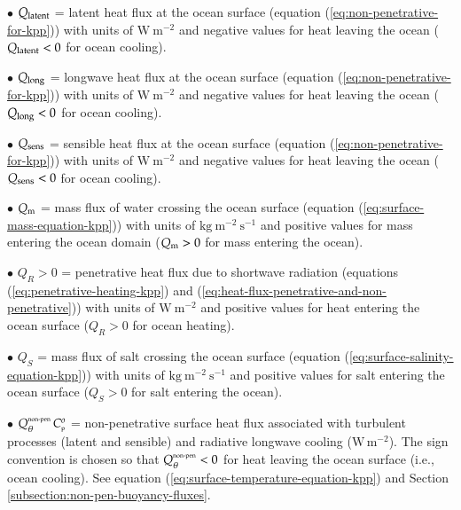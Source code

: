 \begin{trivlist}
\item[$\bullet$] $Q_{\mbox{\scriptsize latent}}$ = latent heat flux at
  the ocean surface (equation (\ref{eq:non-penetrative-for-kpp})) with
  units of $\mbox{W}~\mbox{m}^{-2}$ and negative values for heat
  leaving the ocean ($Q_{\mbox{\scriptsize latent}} < 0$ for ocean
  cooling).

\item[$\bullet$] $Q_{\mbox{\scriptsize long}}$ = longwave heat flux at
  the ocean surface (equation (\ref{eq:non-penetrative-for-kpp})) with
  units of $\mbox{W}~\mbox{m}^{-2}$ and negative values for heat
  leaving the ocean ($Q_{\mbox{\scriptsize long}} < 0$ for ocean
  cooling).

\item[$\bullet$] $Q_{\mbox{\scriptsize sens}}$ = sensible heat flux at
  the ocean surface (equation (\ref{eq:non-penetrative-for-kpp})) with
  units of $\mbox{W}~\mbox{m}^{-2}$ and negative values for heat
  leaving the ocean ($Q_{\mbox{\scriptsize sens}} < 0$ for ocean
  cooling).

\item[$\bullet$] $Q_{\mbox{\scriptsize m}}$ = mass flux of water crossing the ocean surface
  (equation (\ref{eq:surface-mass-equation-kpp})) with units of
  $\mbox{kg}~\mbox{m}^{-2}~\mbox{s}^{-1}$ and positive values for mass
  entering the ocean domain ($Q_{\mbox{\scriptsize m}} > 0$ for mass entering the ocean).

\item[$\bullet$] $Q_{R} > 0$ = penetrative heat flux due to shortwave
  radiation (equations (\ref{eq:penetrative-heating-kpp}) and
  (\ref{eq:heat-flux-penetrative-and-non-penetrative})) with units of
  $\mbox{W}~\mbox{m}^{-2}$ and positive values for heat entering the
  ocean surface ($Q_{R} > 0$ for ocean heating).

\item[$\bullet$] $Q_{S}$ = mass flux of salt crossing the ocean
  surface (equation (\ref{eq:surface-salinity-equation-kpp})) with
  units of $\mbox{kg}~\mbox{m}^{-2}~\mbox{s}^{-1}$ and positive values
  for salt entering the ocean surface ($Q_{S} > 0$ for salt entering
  the ocean).

\item[$\bullet$] $Q_{\theta}^{\mbox{\tiny non-pen}} \, C_{\mbox{\tiny p}}^{o}$ =
  non-penetrative surface heat flux associated with turbulent
  processes (latent and sensible) and radiative longwave cooling
  ($\mbox{W} \, \mbox{m}^{-2}$).  The sign convention is chosen so
  that $Q_{\theta}^{\mbox{\tiny non-pen}} < 0$ for heat leaving the
  ocean surface (i.e., ocean cooling).  See equation
  (\ref{eq:surface-temperature-equation-kpp}) and Section
  \ref{subsection:non-pen-buoyancy-fluxes}.


\end{trivlist}
